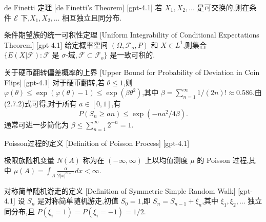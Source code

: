 \documentclass[UTF8]{ctexart}
\begin{document}
    
    
    \begin{thm}
        {de Finetti 定理}
        [de Finetti's Theorem]
        [gpt-4.1]
        若 $X _ { 1 } , X _ { 2 } , \dots$ 是可交换的,则在条件 $\mathcal { E }$ 下,$X _ { 1 } , X _ { 2 } , \ldots$ 相互独立且同分布.
    \end{thm}
    
    
    
    \begin{thm}
        {条件期望族的统一可积性定理}
        [Uniform Integrability of Conditional Expectations Theorem]
        [gpt-4.1]
        给定概率空间 $( \Omega , \mathcal{F}_o , P )$ 和 $X \in L^{1}$,则集合 $\{ E ( X | {\mathcal{F}} ) : {\mathcal{F}} \text{ 是 } \sigma\text{-域}, {\mathcal{F}} \subset \mathcal{F}_o \}$ 是一致可积的.
    \end{thm}
    
    
    
    \begin{crl}
        {关于硬币翻转偏差概率的上界}
        [Upper Bound for Probability of Deviation in Coin Flips]
        [gpt-4.1]
        对于硬币翻转,若 $\theta \leq 1$,则 $\varphi(\theta) \leq \exp(\varphi(\theta) - 1) \leq \exp(\beta \theta^{2})$,其中 $\beta = \sum_{n=1}^{\infty} 1/(2n)! \approx 0.586$.由(2.7.2)式可得,对于所有 $a \in [0, 1]$,有
\[
P(S_{n} \geq a n) \leq \exp(- n a^{2} / 4\beta).
\]
通常可进一步简化为 $\beta \leq \sum_{n=1}^{\infty} 2^{-n} = 1$.
    \end{crl}
    
    
    
    \begin{dfn}
        {Poisson过程的定义}
        [Definition of Poisson Process]
        [gpt-4.1]
        
极限族随机变量 $N(A)$ 称为在 $(-\infty, \infty)$ 上以均值测度 $\mu$ 的 Poisson 过程,其中 $\mu(A) = \int_A \frac{\alpha}{2 | x |^{\alpha + 1}} dx < \infty$.

    \end{dfn}
    
    
    
    \begin{dfn}
        {对称简单随机游走的定义}
        [Definition of Symmetric Simple Random Walk]
        [gpt-4.1]
        设 $S_n$ 是对称简单随机游走,初值 $S_0 = 1$,即 $S_n = S_{n-1} + \xi_n$,其中 $\xi_1, \xi_2, \ldots$ 独立同分布,且 $P ( \xi_i = 1 ) = P ( \xi_i = -1 ) = 1 / 2$.
    \end{dfn}
    
\end{document}
